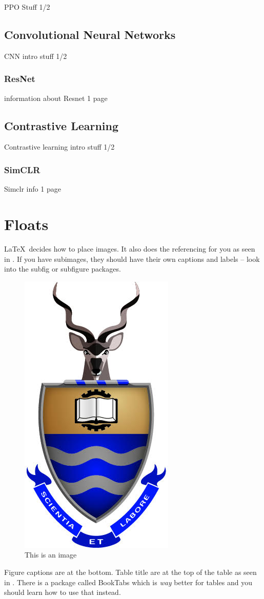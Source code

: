 \documentclass[a4paper,twoside,12pt]{report}
\begin{document}
PPO Stuff 1/2

\section{Convolutional Neural Networks}
\label{cnn}

CNN intro stuff 1/2

\subsection{ResNet}
\label{resnet}

information about Resnet 1 page

\section{Contrastive Learning}
\label{contrastivelrn}

Contrastive learning intro stuff 1/2

\subsection{SimCLR}
\label{simclr}

Simclr info 1 page





\chapter{Floats}
\LaTeX\ decides how to place images. It also does the referencing for you as seen in . If you have subimages, they should have their own captions and labels -- look into the subfig or subfigure packages.

\begin{figure}[ht]
	\centering
	\includegraphics[width=0.1\linewidth]{images/wits}
	\caption{This is an image}
	\label{fig:thing1}
\end{figure}

Figure captions are at the bottom. Table title are at the top of the table as seen in . There is a package called BookTabs which is \textit{way} better for tables and you should learn how to use that instead.
\end{document}
